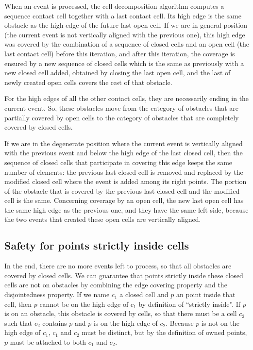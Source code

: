 \documentclass[a4paper, USenglish, cleveref, autoref, thm-restate, final]{lipics-v2021}
\begin{document}
When an event is processed, the cell decomposition algorithm computes
a sequence contact cell together with a last contact cell.  Its high edge
is the same obstacle as the high edge of the future last open cell.  If we
are in general position (the current event is not vertically aligned
with the previous one), this high
edge was covered by the combination of a sequence of closed cells and
an open cell (the last contact cell) before this iteration,
and after this iteration, the coverage is ensured by a new sequence
of closed cells which is the same as previously with a new closed cell added,
obtained by closing the last open cell, and the last of newly created open
cells covers the rest of that obstacle.

For the high edges of all the other contact cells, they are
necessarily ending in the current event.  So, these obstacles move from
the category of obstacles that are partially covered by open cells to
the category of obstacles that are completely covered by closed cells.

If we are in the degenerate position where the current event is
vertically aligned with the previous event and below the high edge of the
last closed cell, then the sequence of closed cells that participate
in covering this edge keeps the same number of elements: the previous last
closed cell is removed and replaced by the modified closed cell
where the event is added among its right points.  The portion of the
obstacle that is covered by the previous last closed cell and the
modified cell is the same.  Concerning coverage by an open cell, the
new last open cell has the same high edge as the previous one, and
they have the same left side, because the two events that created
these open cells are vertically aligned.
\subsection{Safety for points strictly inside cells}
In the end, there are no more events left to process, so that all
obstacles are covered by closed cells.  
We can guarantee that points strictly inside these closed cells are not
on obstacles by combining the edge covering property and the
disjointedness property.  If we name \(c_1\) a closed cell and \(p\) an
point inside that cell, then \(p\) cannot be on the high edge of
\(c_1\) by definition of ``strictly inside''.  If \(p\) is on an
obstacle, this obstacle is covered by cells, so that there must be a
cell \(c_2\) such that \(c_2\) contains \(p\) and \(p\) is on the high
edge of \(c_2\).  Because \(p\) is not on the high edge of \(c_1\),
\(c_1\) and \(c_2\) must be distinct, but by the definition of
owned points, \(p\) must be attached to both \(c_1\) and \(c_2\).
\end{document}
